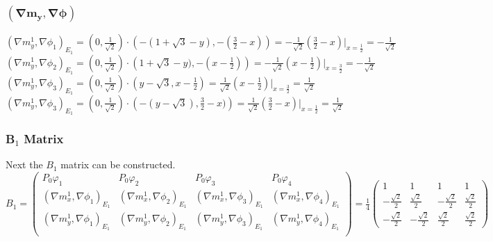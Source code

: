 \documentclass{article}
\begin{document}
{\subsubsection{$\mathbf{(\nabla m_y,\nabla\phi)}$}
$(\nabla m_y^1,\nabla\phi_1)_{E_1} = 
\left(0,\frac{1}{\sqrt{2}}\right)\cdot\left(-(1 + \sqrt{3} - y),  -(\frac{3}{2}-x)\right) = 
-\frac{1}{\sqrt{2}}(\frac{3}{2}-x)|_{x=\frac{1}{2}} = 
-\frac{1}{\sqrt{2}}$\\
$(\nabla m_y^1,\nabla\phi_2)_{E_1} = 
\left(0,\frac{1}{\sqrt{2}}\right)\cdot\left(1 + \sqrt{3} - y),  -(x-\frac{1}{2})\right) = 
-\frac{1}{\sqrt{2}}(x - \frac{1}{2})|_{x=\frac{3}{2}} = 
-\frac{1}{\sqrt{2}}$\\
$(\nabla m_y^1,\nabla\phi_3)_{E_1} = 
\left(0,\frac{1}{\sqrt{2}}\right)\cdot\left(y-\sqrt{3}, x-\frac{1}{2}\right) = 
\frac{1}{\sqrt{2}}(x-\frac{1}{2})|_{x=\frac{3}{2}} = 
\frac{1}{\sqrt{2}}$\\
$(\nabla m_y^1,\nabla\phi_3)_{E_1} = 
\left(0,\frac{1}{\sqrt{2}}\right)\cdot\left(-(y-\sqrt{3}), \frac{3}{2}-x)\right) = 
\frac{1}{\sqrt{2}}(\frac{3}{2}-x)|_{x=\frac{1}{2}} = 
\frac{1}{\sqrt{2}}$\\

\subsubsection{B$_1$ Matrix}
Next the $B_1$ matrix can be constructed.\\
$B_1 = \begin{pmatrix}
    P_0\varphi_1 & P_0\varphi_2 & P_0\varphi_3 & P_0\varphi_4\\
    (\nabla m_x^1,\nabla\phi_1)_{E_1} & (\nabla m_x^1,\nabla\phi_2)_{E_1} & (\nabla m_x^1,\nabla\phi_3)_{E_1} & (\nabla m_x^1,\nabla\phi_4)_{E_1}\\
    (\nabla m_y^1,\nabla\phi_1)_{E_1} & (\nabla m_y^1,\nabla\phi_2)_{E_1} & (\nabla m_y^1,\nabla\phi_3)_{E_1} & (\nabla m_y^1,\nabla\phi_4)_{E_1}\\
\end{pmatrix} =
\frac{1}{4}\begin{pmatrix}
    1 & 1 & 1 & 1 \\
    -\frac{\sqrt{2}}{2} & \frac{\sqrt{2}}{2} & -\frac{\sqrt{2}}{2} & \frac{\sqrt{2}}{2}\\
    -\frac{\sqrt{2}}{2} & -\frac{\sqrt{2}}{2} & \frac{\sqrt{2}}{2} & \frac{\sqrt{2}}{2}
\end{pmatrix}$

}
\end{document}
